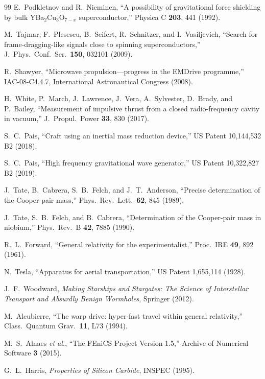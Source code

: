 \documentclass[twocolumn,prl,superscriptaddress,nofootinbib,longbibliography,floatfix]{revtex4-2}
\begin{document}
\begin{thebibliography}{99}
E.~Podkletnov and R.~Nieminen,
``A possibility of gravitational force shielding by bulk
YBa$_2$Cu$_3$O$_{7-x}$ superconductor,''
Physica C \textbf{203}, 441 (1992).

M.~Tajmar, F.~Plesescu, B.~Seifert, R.~Schnitzer, and I.~Vasiljevich,
``Search for frame-dragging-like signals close to spinning
superconductors,''
J.\ Phys.\ Conf.\ Ser.\ \textbf{150}, 032101 (2009).

R.~Shawyer,
``Microwave propulsion---progress in the EMDrive programme,''
IAC-08-C4.4.7, International Astronautical Congress (2008).

H.~White, P.~March, J.~Lawrence, J.~Vera, A.~Sylvester,
D.~Brady, and P.~Bailey,
``Measurement of impulsive thrust from a closed radio-frequency cavity
in vacuum,''
J.\ Propul.\ Power \textbf{33}, 830 (2017).

S.~C.~Pais,
``Craft using an inertial mass reduction device,''
US Patent 10,144,532 B2 (2018).

S.~C.~Pais,
``High frequency gravitational wave generator,''
US Patent 10,322,827 B2 (2019).

J.~Tate, B.~Cabrera, S.~B.~Felch, and J.~T.~Anderson,
``Precise determination of the Cooper-pair mass,''
Phys.\ Rev.\ Lett.\ \textbf{62}, 845 (1989).

J.~Tate, S.~B.~Felch, and B.~Cabrera,
``Determination of the Cooper-pair mass in niobium,''
Phys.\ Rev.\ B \textbf{42}, 7885 (1990).

R.~L.~Forward,
``General relativity for the experimentalist,''
Proc.\ IRE \textbf{49}, 892 (1961).

N.~Tesla,
``Apparatus for aerial transportation,''
US Patent 1,655,114 (1928).

J.~F.~Woodward,
\emph{Making Starships and Stargates: The Science of Interstellar
Transport and Absurdly Benign Wormholes},
Springer (2012).

M.~Alcubierre,
``The warp drive: hyper-fast travel within general relativity,''
Class.\ Quantum Grav.\ \textbf{11}, L73 (1994).

M.~S.~Alnaes \emph{et al.},
``The FEniCS Project Version 1.5,''
Archive of Numerical Software \textbf{3} (2015).

G.~L.~Harris,
\emph{Properties of Silicon Carbide},
INSPEC (1995).


\end{thebibliography}
\end{document}
